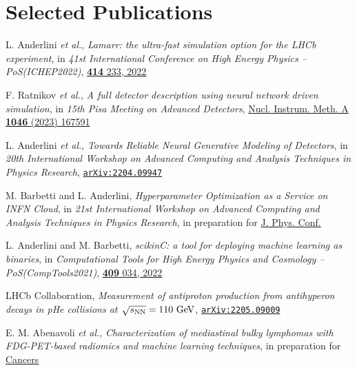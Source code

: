 \newcommand{\arxiv}[1]
  {\href{https://arxiv.org/abs/#1}{\texttt{arXiv:#1}}}


\section*{Selected Publications}
\begin{cvcontent}
 \begin{enumerate}[label={[\arabic*]}, leftmargin=1cm]
    \item \label{pub:lamarr-ichep} L. Anderlini \emph{et al.},
    \emph{Lamarr: the ultra-fast simulation option for the LHCb experiment},
    in \emph{41st International Conference on High Energy Physics -- PoS(ICHEP2022)},
    \href{https://doi.org/10.22323/1.414.0233}{\textbf{414} 233, 2022}
    \item \label{pub:gan-pm} F. Ratnikov \emph{et al.},
    \emph{A full detector description using neural network driven simulation},
    in \emph{15th Pisa Meeting on Advanced Detectors},
    \href{https://doi.org/10.1016/j.nima.2022.167591}{Nucl. Instrum. Meth. A \textbf{1046} (2023) 167591}
    \sloppy
    \item \label{pub:gan-acat} L. Anderlini \emph{et al.},
    \emph{Towards Reliable Neural Generative Modeling of Detectors},
    in \emph{20th International Workshop on Advanced Computing and Analysis Techniques in Physics Research},
    \arxiv{2204.09947}
    \item \label{pub:hopaas} M. Barbetti and L. Anderlini,
    \emph{Hyperparameter Optimization as a Service on INFN Cloud},
    in \emph{21st International Workshop on Advanced Computing and Analysis Techniques in Physics Research},
    in preparation for \href{https://iopscience.iop.org/journal/1742-6596}{J. Phys. Conf.}
    \item \label{pub:scikinc} L. Anderlini and M. Barbetti, 
    \emph{scikinC: a tool for deploying machine learning as binaries}, 
    in \emph{Computational Tools for High Energy Physics and Cosmology -- PoS(CompTools2021)}, 
    \href{https://doi.org/10.22323/1.409.0034}{\textbf{409} 034, 2022}
    \item \label{pub:smog-pub} LHCb Collaboration,
    \emph{Measurement of antiproton production from antihyperon decays in pHe collisions at $\sqrt{s_{\rm{NN}}}=110~\rm{GeV}$},
    \arxiv{2205.09009}
    \item \label{pub:phys-med} E. M. Abenavoli \emph{et al.},
    \emph{Characterization of mediastinal bulky lymphomas with FDG-PET-based radiomics and machine learning techniques},
    in preparation for \href{https://www.mdpi.com/journal/cancers}{Cancers}
 \end{enumerate}
\end{cvcontent}